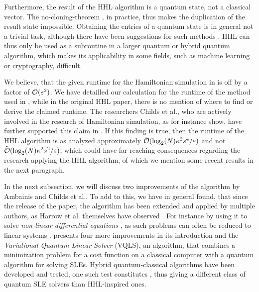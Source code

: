 \phantom{}

Furthermore, the result of the HHL algorithm is a quantum state, not a classical vector. The no-cloning-theorem \cite[pp. 81-84]{Homeister2018}, in practice, thus makes the duplication of the result state impossible. Obtaining the entries of a quantum state is in general not a trivial task, although there have been suggestions for such methods \cite[pp. 14-25]{Brassard2000}. HHL can thus only be used as a subroutine in a larger quantum or hybrid quantum algorithm, which makes its applicability in some fields, such as machine learning or cryptography, difficult.

\phantom{}

We believe, that the given runtime for the Hamiltonian simulation in \cite[p. 6]{Harrow2008} is off by a factor of \(\operatorname{\mathcal{O}}(s^2)\). We have detailled our calculation for the runtime of the method used in , while in the original HHL paper, there is no mention of where to find or derive the claimed runtime. The researchers Childs et al., who are actively involved in the research of Hamiltonian simulation, as for instance \cite{Childs2010,Childs2015} show, have further supported this claim in \cite[p. 2]{Childs2010}. If this finding is true, then the runtime of the HHL algorithm is as analyzed approximately \(\tilde{\operatorname{\mathcal{O}}}(\log_2(N)\kappa^2s^4/\varepsilon)\) and not \(\tilde{\operatorname{\mathcal{O}}}(\log_2(N)\kappa^2s^2/\varepsilon)\), which could have far reaching consequences regarding the research applying the HHL algorithm, of which we mention some recent results in the next paragraph.

\phantom{}

In the next subsection, we will discuss two improvements of the algorithm by Ambainis and Childs et al.. To add to this, we have in general found, that since the release of the paper, the algorithm has been extended and applied by multiple authors, as Harrow et al. themselves have observed \cite[pp. 4-5]{Harrow2008}. For instance by using it to solve \emph{non-linear differential equations} \cite{Leyton2008}, as such problems can often be reduced to linear systems \cite{Forster2017}. \cite{BravoPrieto2019} presents four more improvements in its introduction and the \emph{Variational Quantum Linear Solver} (VQLS), an algorithm, that combines a minimization problem for a cost function on a classical computer with a quantum algorithm for solving SLEs. Hybrid quantum-classical algorithms have been developed and tested, one such test constitutes \cite{Lee2019}, thus giving a different class of quantum SLE solvers than HHL-inspired ones.

